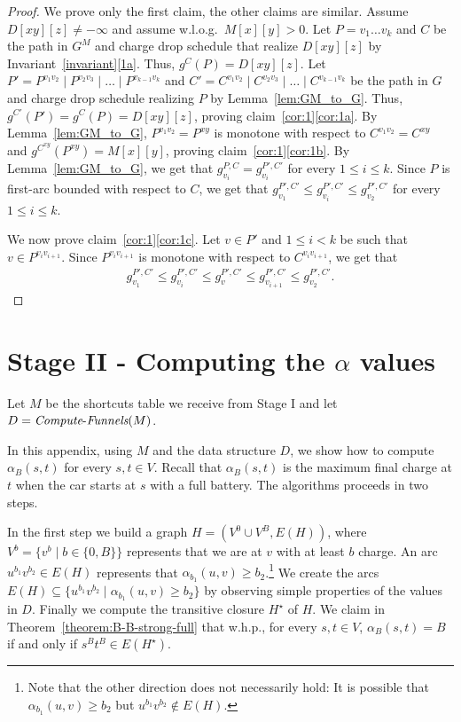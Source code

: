 \documentclass[11pt]{article}
\newcommand{\ComputeF}{\mbox{{\it Compute}-{\it Funnels}}}
\begin{document}
\begin{proof}
    We prove only the first claim, the other claims are similar. Assume $D[xy][z]\neq -\infty$ and assume w.l.o.g.\ $M[x][y] >0$. Let $P=v_1 \ldots v_k$ and $C$ be the path in $G^M$ and charge drop schedule that realize $D[xy][z]$ by Invariant~\ref{invariant}\ref{1a}. Thus, $g^C(P)=D[xy][z]$. 
    Let $P' = P^{v_1 v_2} \mid P^{v_2 v_3}\mid \ldots \mid P^{v_{k-1}v_k}$ and $C' = C^{v_1 v_2} \mid C^{v_2 v_3}\mid \ldots \mid C^{v_{k-1}v_k}$ be the path in $G$ and charge drop schedule realizing $P$  by Lemma~\ref{lem:GM_to_G}.
    Thus, $g^{C'}(P')=g^C(P)=D[xy][z]$, proving claim~\ref{cor:1}\ref{cor:1a}.
    By Lemma~\ref{lem:GM_to_G}, $P^{v_1 v_2} = P^{xy}$ is monotone with respect to $C^{v_1 v_2} = C^{xy}$ and $g^{C^{xy}}(P^{xy}) = M[x][y]$, proving claim~\ref{cor:1}\ref{cor:1b}.
    By Lemma~\ref{lem:GM_to_G}, we get that $g^{P,C}_{v_i} = g^{P',C'}_{v_i}$ for every $1\le i\le k$. Since $P$ is first-arc bounded with respect to $C$, we get that $g^{P',C'}_{v_1} \le g^{P',C'}_{v_i} \le g^{P',C'}_{v_2}$ for every $1\le i\le k$. 

    We now prove claim~\ref{cor:1}\ref{cor:1c}. Let $v\in P'$ and $1\le i<k$ be such that $v\in P^{v_i v_{i+1}}$. Since $P^{v_i v_{i+1}}$ is monotone with respect to $C^{v_i v_{i+1}}$, we get that 
    \begin{align*}
        g^{P',C'}_{v_1} \le g^{P',C'}_{v_i} \le 
        g^{P',C'}_{v} \le
        g^{P',C'}_{v_{i+1}} \le
        g^{P',C'}_{v_2}.
    \end{align*}
\end{proof}


\section{Stage II - Computing the \texorpdfstring{$\alpha$}{alpha} values}\label{S-algorithm}
Let $M$ be the shortcuts table we receive from Stage I and let $D = \ComputeF(M)$.

In this appendix, using $M$ and the data structure $D$, we show how to compute $\alpha_B(s,t)$ for every $s,t\in V$. Recall that $\alpha_B(s,t)$ is the maximum final charge at $t$ when the car starts at $s$ with a full battery. The algorithms proceeds in two steps.

In the first step we build a graph $H = (V^0 \cup V^B, E(H))$, where $V^b = \{v^b \mid b\in \{0,B\} \}$ represents that we are at $v$ with at least $b$ charge.  An arc $u^{b_1} v^{b_2}\in E(H)$ represents that $\alpha_{b_1}(u,v) \ge b_2$.\footnote{Note that the other direction does not necessarily hold: It is possible that $\alpha_{b_1}(u,v) \ge b_2$ but $u^{b_1} v^{b_2}\notin E(H)$.} We create the arcs $E(H) \subseteq \{u^{b_1} v^{b_2} \mid  \alpha_{b_1}(u,v) \ge b_2\}$ by observing simple properties of the values in $D$. Finally we 
compute the 
transitive closure $H^\star$ of $H$. We claim in Theorem~\ref{theorem:B-B-strong-full} that w.h.p., for every $s,t\in V$, $\alpha_B(s,t)=B$ if and only if $s^B t^B \in E(H^\star)$.
\end{document}
